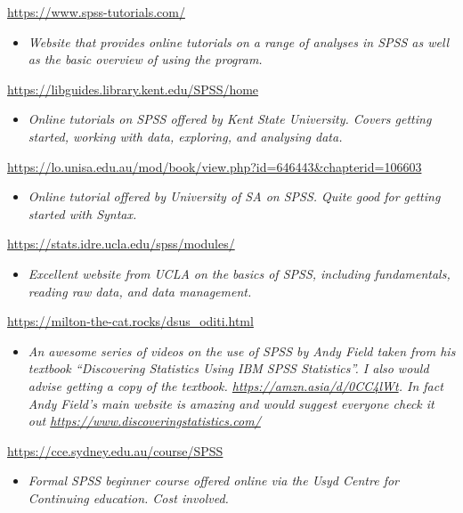 \documentclass[
]{book}
\providecommand{\tightlist}{%
  \setlength{\itemsep}{0pt}\setlength{\parskip}{0pt}}
\begin{document}
\url{https://www.spss-tutorials.com/}

\begin{itemize}
\tightlist
\item
  \emph{Website that provides online tutorials on a range of analyses in SPSS as well as the basic overview of using the program.}
\end{itemize}

\url{https://libguides.library.kent.edu/SPSS/home}

\begin{itemize}
\tightlist
\item
  \emph{Online tutorials on SPSS offered by Kent State University. Covers getting started, working with data, exploring, and analysing data.}
\end{itemize}

\url{https://lo.unisa.edu.au/mod/book/view.php?id=646443\&chapterid=106603}

\begin{itemize}
\tightlist
\item
  \emph{Online tutorial offered by University of SA on SPSS. Quite good for getting started with Syntax.}
\end{itemize}

\url{https://stats.idre.ucla.edu/spss/modules/}

\begin{itemize}
\tightlist
\item
  \emph{Excellent website from UCLA on the basics of SPSS, including fundamentals, reading raw data, and data management.}
\end{itemize}

\url{https://milton-the-cat.rocks/dsus_oditi.html}

\begin{itemize}
\tightlist
\item
  \emph{An awesome series of videos on the use of SPSS by Andy Field taken from his textbook ``Discovering Statistics Using IBM SPSS Statistics''. I also would advise getting a copy of the textbook. \url{https://amzn.asia/d/0CC4lWt}. In fact Andy Field's main website is amazing and would suggest everyone check it out \url{https://www.discoveringstatistics.com/}}
\end{itemize}

\url{https://cce.sydney.edu.au/course/SPSS}

\begin{itemize}
\tightlist
\item
  \emph{Formal SPSS beginner course offered online via the Usyd Centre for Continuing education. Cost involved. }
\end{itemize}
\end{document}
